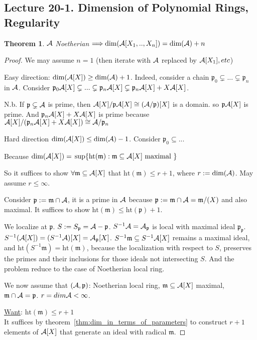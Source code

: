 \documentclass[11pt]{article}
\newtheorem{thm}{Theorem}[section]
\newcommand{\scm}{{\mathfrak m}}
\newcommand{\scp}{{\mathfrak p}}
\newcommand{\cala}{{\cal A}}
\newcommand{\Lrta}{\Longrightarrow}
\begin{document}
\subsection{Lecture 20-1. Dimension of Polynomial Rings, Regularity}
\begin{thm}
$\cala$ Noetherian $\Lrta \text{dim}(\cala[X_1,..,X_n])=\text{dim}(\cala)+n$
\end{thm}
\begin{proof}
We may assume $n=1$ (then iterate with $\cala$ replaced by $\cala[X_1], etc$)

Easy direction: $\text{dim}(\cala[X])\geq \text{dim}(\cala)+1$. Indeed, consider a chain $\scp_0\subsetneq ...\subsetneq \scp_n$ in $\cala$. Consider $\scp_0\cala[X]\subsetneq ...\subsetneq \scp_n\cala[X]\subsetneq \scp_n\cala[X]+X\cala[X]$.

N.b. If $\scp\subsetneq \cala$ is prime, then $\cala[X]/\scp\cala[X]\cong (\cala/\scp)[X]$ is  a domain. so $\scp\cala[X]$ is prime.
And $\scp_n\cala[X]+X\cala[X]$ is prime because $\cala[X]/(\scp_n\cala[X]+X\cala[X])\cong \cala/\scp_n$

Hard direction $\text{dim}(\cala[X])\leq \text{dim}(\cala)-1$. Consider $\scp_0\subseteq...$

Because $\text{dim}(\cala[X])=$ $\sup\{\text{ht}(\scm):\scm\subseteq \cala[X] \text{ maximal }\}$

So it suffices to show $\forall\scm\subseteq \cala[X]$ that $\text{ht}(\scm)\leq r+1$, where $r:=\text{dim}(\cala)$. May assume $r\leq \infty$.

Consider $\scp:=\scm\cap\cala$, it is a prime in $\cala$ because $\scp:=\scm\cap\cala=\scm/(X)$ and also maximal. It suffices to show $\text{ht}(\scm)\leq \text{ht}(\scp)+1$.

We localize at $\scp$. $S:=S_\scp=\cala-\scp$. $S^{-1}\cala=\cala_\scp$ is local with maximal ideal $\scp_\scp$. $S^{-1}(\cala[X])=(S^{-1}\cala)[X]=\cala_\scp[X]$. $S^{-1}\scm\subseteq S^{-1}\cala[X]$ remains a maximal ideal, and $\text{ht}(S^{-1}\scm)=\text{ht}(\scm)$, because the localization with respect to $S$, preserves the primes and their inclusions for those ideals not intersecting $S$. And the problem reduce to the case of Noetherian local ring.

We now assume that $(\cala,\scp)$: Noetherian local ring, $\scm\subseteq\cala[X]$ maximal, $\scm\cap\cala=\scp$. $r=dim\cala< \infty$.

\underline{Want}: $\text{ht}(\scm)\leq r+1$\\
It suffices by theorem~\ref{thm:dim_in_terms_of_parameters}  to construct $r+1$ elements of $\cala[X]$ that generate an ideal with radical $\scm$.


\end{proof}
\end{document}
